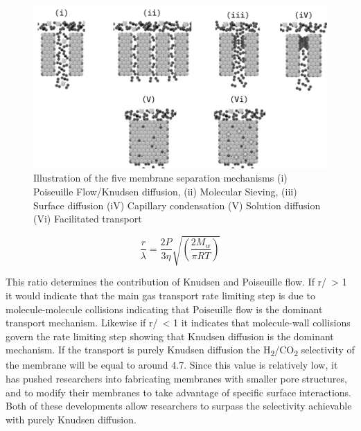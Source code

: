 \begin{figure}
    \includegraphics[width=\linewidth]{figures/septype.png}
    \caption{Illustration of the five membrane separation mechanisms (i) Poiseuille Flow/Knudsen diffusion, (ii) Molecular Sieving, (iii) Surface diffusion (iV) Capillary condensation (V) Solution diffusion (Vi) Facilitated transport}
    \label{fig:1}
  \end{figure}

\begin{equation}\label{eq:6}
    \frac{r}{\lambda} = \frac{2P}{3\eta}\sqrt{\left(\frac{2M_w}{\pi RT} \right)}
\end{equation}

This ratio determines the contribution of Knudsen and Poiseuille flow. If r/\textlambda \ > 1 it would indicate 
that the main gas transport rate limiting step is due to molecule-molecule collisions indicating that 
Poiseuille flow is the dominant transport mechanism. Likewise if r/\textlambda \ < 1 it indicates that 
molecule-wall collisions govern the rate limiting step showing that Knudsen diffusion is the dominant 
mechanism. If the transport is purely Knudsen diffusion the H\textsubscript{2}/CO\textsubscript{2} selectivity of 
the membrane will be equal to around 4.7. Since this value is relatively low, it has pushed researchers 
into fabricating membranes with smaller pore structures, and to modify their membranes to take advantage of 
specific surface interactions. Both of these developments allow researchers to surpass the selectivity 
achievable with purely Knudsen diffusion.

